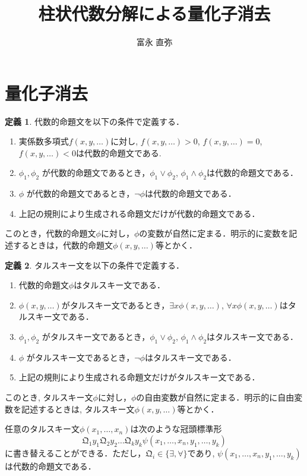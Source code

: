 \documentclass[uplatex, dvipdfmx]{jsarticle}
\newcommand{\Qua}{\mathfrak{Q}}
\theoremstyle{definition}
\newtheorem{definition}{定義}[section]
\begin{document}
\title{柱状代数分解による量化子消去}
\author{富永 直弥}
\maketitle

\section{量化子消去}
\begin{definition}
     代数的命題文を以下の条件で定義する．
     \begin{enumerate}
          \item 実係数多項式$f(x, y, \dots)$に対し, $f(x,y, \dots) > 0$, $f(x,y, \dots) = 0$, $f(x,y, \dots) < 0$は代数的命題文である.
          \item $\phi_1, \phi_2$ が代数的命題文であるとき，$\phi_1 \lor \phi_2$, $\phi_1 \land \phi_2$は代数的命題文である．
          \item $\phi$ が代数的命題文であるとき，$\lnot \phi$は代数的命題文である．
          \item 上記の規則により生成される命題文だけが代数的命題文である．
     \end{enumerate}
     このとき，代数的命題文$\phi$に対し，$\phi$の変数が自然に定まる．明示的に変数を記述するときは，代数的命題文$\phi(x,y,\dots)$等とかく．
\end{definition}

\begin{definition}
     タルスキー文を以下の条件で定義する．
     \begin{enumerate}
          \item 代数的命題文$\phi$はタルスキー文である．
          \item $\phi(x,y,\dots)$がタルスキー文であるとき，$\exists x \phi(x,y,\dots)$, $\forall x \phi(x,y,\dots)$はタルスキー文である．
          \item $\phi_1, \phi_2$ がタルスキー文であるとき，$\phi_1 \lor \phi_2$, $\phi_1 \land \phi_2$はタルスキー文である．
          \item $\phi$ がタルスキー文であるとき，$\lnot \phi$はタルスキー文である．
          \item 上記の規則により生成される命題文だけがタルスキー文である．
     \end{enumerate}
     このとき, タルスキー文$\phi$に対し，$\phi$の自由変数が自然に定まる．明示的に自由変数を記述するときは, タルスキー文$\phi(x, y, \dots)$等とかく． 
\end{definition}
任意のタルスキー文$\phi(x_1, \dots, x_n)$は次のような冠頭標準形
\begin{equation*}
     \Qua_1 y_1 \Qua_2 y_2 \dots \Qua_k y_k \psi(x_1, \dots, x_n, y_1, \dots, y_k)
\end{equation*}
に書き替えることができる．ただし，$\Qua_i \in \{\exists, \forall\}$であり, $\psi(x_1, \dots, x_n, y_1, \dots, y_k)$は代数的命題文である． 
\end{document}
